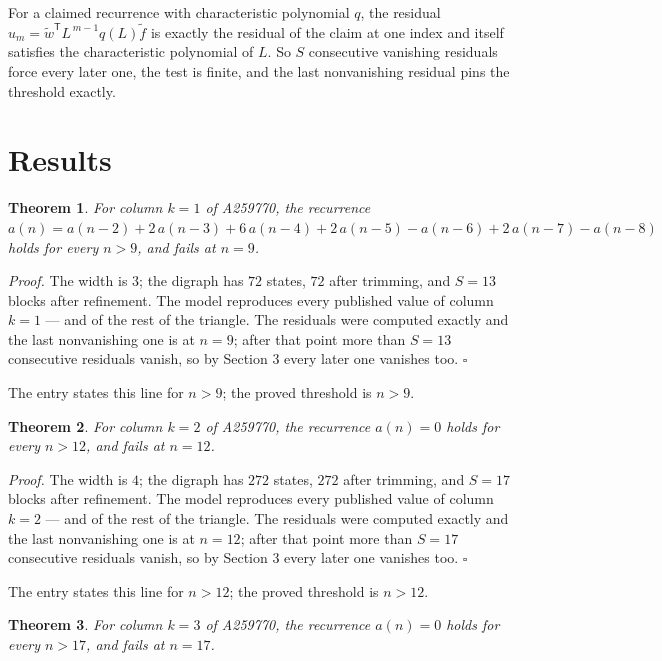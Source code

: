 \documentclass[11pt]{article}
\newtheorem{theorem}{Theorem}
\theoremstyle{definition}
\begin{document}
For a claimed recurrence with characteristic polynomial $q$, the residual $u_m = \tilde w^{\mathsf T}L^{\,m-1}q(L)\tilde f$ is exactly the residual of the claim at one index and itself satisfies the characteristic polynomial of $L$. So $S$ consecutive vanishing residuals force every later one, the test is finite, and the last nonvanishing residual pins the threshold exactly.

\section{Results}

\begin{theorem} For column $k = 1$ of A259770, the recurrence $a(n) = a(n-2) + 2\,a(n-3) + 6\,a(n-4) + 2\,a(n-5) - a(n-6) + 2\,a(n-7) - a(n-8)$ holds for every $n > 9$, and fails at $n = 9$.\end{theorem}

{\itshape Proof.} The width is $3$; the digraph has $72$ states, $72$ after trimming, and $S = 13$ blocks after refinement. The model reproduces every published value of column $k = 1$ --- and of the rest of the triangle. The residuals were computed exactly and the last nonvanishing one is at $n = 9$; after that point more than $S = 13$ consecutive residuals vanish, so by Section 3 every later one vanishes too. $\square$

The entry states this line for $n > 9$; the proved threshold is $n > 9$.

\begin{theorem} For column $k = 2$ of A259770, the recurrence $a(n) = 0$ holds for every $n > 12$, and fails at $n = 12$.\end{theorem}

{\itshape Proof.} The width is $4$; the digraph has $272$ states, $272$ after trimming, and $S = 17$ blocks after refinement. The model reproduces every published value of column $k = 2$ --- and of the rest of the triangle. The residuals were computed exactly and the last nonvanishing one is at $n = 12$; after that point more than $S = 17$ consecutive residuals vanish, so by Section 3 every later one vanishes too. $\square$

The entry states this line for $n > 12$; the proved threshold is $n > 12$.

\begin{theorem} For column $k = 3$ of A259770, the recurrence $a(n) = 0$ holds for every $n > 17$, and fails at $n = 17$.\end{theorem}
\end{document}
